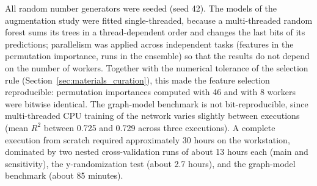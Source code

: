 All random number generators were seeded (seed 42). The models of the augmentation study were fitted single-threaded, because a multi-threaded random forest sums its trees in a thread-dependent order and changes the last bits of its predictions; parallelism was applied across independent tasks (features in the permutation importance, runs in the ensemble) so that the results do not depend on the number of workers. Together with the numerical tolerance of the selection rule (Section~\ref{sec:materials_curation}), this made the feature selection reproducible: permutation importances computed with 46 and with 8 workers were bitwise identical. The graph-model benchmark is not bit-reproducible, since multi-threaded CPU training of the network varies slightly between executions (mean $R^2$ between 0.725 and 0.729 across three executions). A complete execution from scratch required approximately 30 hours on the workstation, dominated by two nested cross-validation runs of about 13 hours each (main and sensitivity), the y-randomization test (about 2.7 hours), and the graph-model benchmark (about 85 minutes).
